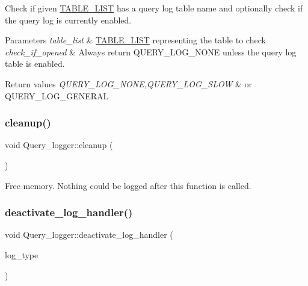 Check if given \mbox{\hyperlink{structTABLE__LIST}{T\+A\+B\+L\+E\+\_\+\+L\+I\+ST}} has a query log table name and optionally check if the query log is currently enabled.


\begin{DoxyParams}{Parameters}
{\em table\+\_\+list} & \mbox{\hyperlink{structTABLE__LIST}{T\+A\+B\+L\+E\+\_\+\+L\+I\+ST}} representing the table to check \\
\hline
{\em check\+\_\+if\+\_\+opened} & Always return Q\+U\+E\+R\+Y\+\_\+\+L\+O\+G\+\_\+\+N\+O\+NE unless the query log table is enabled.\\
\hline
\end{DoxyParams}

\begin{DoxyRetVals}{Return values}
{\em Q\+U\+E\+R\+Y\+\_\+\+L\+O\+G\+\_\+\+N\+O\+NE,Q\+U\+E\+R\+Y\+\_\+\+L\+O\+G\+\_\+\+S\+L\+OW} & or Q\+U\+E\+R\+Y\+\_\+\+L\+O\+G\+\_\+\+G\+E\+N\+E\+R\+AL \\
\hline
\end{DoxyRetVals}
\mbox{\label{classQuery__logger_a83604951e8caedf803872ce838305369}} 
\subsubsection{\texorpdfstring{cleanup()}{cleanup()}}
{\footnotesize\ttfamily void Query\+\_\+logger\+::cleanup (\begin{DoxyParamCaption}{ }\end{DoxyParamCaption})}

Free memory. Nothing could be logged after this function is called. \mbox{\label{classQuery__logger_a8a25076c9d7c8141776fc952ba126f9d}} 
\subsubsection{\texorpdfstring{deactivate\+\_\+log\+\_\+handler()}{deactivate\_log\_handler()}}
{\footnotesize\ttfamily void Query\+\_\+logger\+::deactivate\+\_\+log\+\_\+handler (\begin{DoxyParamCaption}\item[{enum\+\_\+log\+\_\+table\+\_\+type}]{log\+\_\+type }\end{DoxyParamCaption})}

